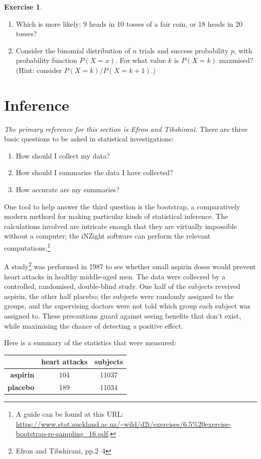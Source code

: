 \documentclass[a4paper,leqno]{article}
\numberwithin{equation}{section}
\theoremstyle{definition}
\newtheorem{exercise}[equation]{Exercise}
\theoremstyle{remark}
\begin{document}
\begin{exercise}\leavevmode
  \begin{enumerate}
    \item Which is more likely: 9 heads in 10 tosses of a fair coin, or 18 heads in 20 tosses?
    \item Consider the binomial distribution of $ n $ trials and success probability $ p $, with probability function $ P(X = x) $. For what
          value $ k $ is $ P(X = k) $ maxmised? (Hint: consider $ P(X = k)/P(X = k+1) $.)
  \end{enumerate}
\end{exercise}

\section{Inference}
\textit{The primary reference for this section is Efron and Tibshirani.}
There are three basic questions to be asked in statistical investigations:
\begin{enumerate}
  \item How should I collect my data?
  \item How should I summarise the data I have collected?
  \item How accurate are my summaries?
\end{enumerate}
One tool to help answer the third question is the bootstrap, a comparatively modern methord for making
particular kinds of statistical inference. The calculations involved are intricate enough that they
are virtually impossible without a computer; the iNZight software can perform the relevant computations.\footnote{A
guide can be found at this URL: \url{https://www.stat.auckland.ac.nz/~wild/d2i/exercises/6.5\%20exercise-bootstrap-re-sampling_16.pdf}.}

A study\footnote{Efron and Tibshirani, pp.2--4} was performed in 1987 to see whether small aspirin doses
would prevent heart attacks in healthy middle-aged men. The data  were collecred by a controlled, randomised,
double-blind study. One half of the subjects reveived aspirin, the other half placebo; the subjects were
randomly assigned to the groups, and the supervising doctors were not told which group each subject was
assigned to. These precautions guard against seeing benefits that don't exist, while maximising the chance
of detecting a positive effect.

Here is a summary of the statistics that were measured:
\begin{center}
  \begin{tabular}{r|cc}
    & \textbf{heart attacks} & \textbf{subjects}\\\hline
    \textbf{aspirin} & 104 & 11037\\
    \textbf{placebo} & 189 & 11034
  \end{tabular}
\end{center}
\end{document}
